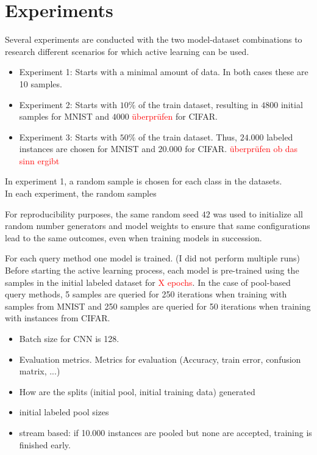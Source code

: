 \documentclass{article}
\theoremstyle{plain}
\theoremstyle{definition}
\theoremstyle{remark}
\begin{document}
\section{Experiments}\label{sec:experiments}
Several experiments are conducted with the two model-dataset combinations to research different scenarios for which active learning can be used.
\begin{itemize}
	\item Experiment 1: Starts with a minimal amount of data. In both cases these are 10 samples.
	\item Experiment 2: Starts with $10\%$ of the train dataset, resulting in $4800$ initial samples for MNIST and $4000$ \textcolor{red}{überprüfen} for CIFAR.
	\item Experiment 3: Starts with $50\%$ of the train dataset. Thus, $24.000$ labeled instances are chosen for MNIST and $20.000$ for CIFAR. \textcolor{red}{überprüfen ob das sinn ergibt}
\end{itemize}
In experiment 1, a random sample is chosen for each class in the datasets. \\
In each experiment, the random samples 

For reproducibility purposes, the same random seed $42$ was used to initialize all random number generators and model weights to ensure that same configurations lead to the same outcomes, even when training models in succession. 

For each query method one model is trained. (I did not perform multiple runs)
Before starting the active learning process, each model is pre-trained using the samples in the initial labeled dataset for \textcolor{red}{X epochs}. In the case of pool-based query methods, 5 samples are queried for 250 iterations when training with samples from MNIST and 250 samples are queried for 50 iterations when training with instances from CIFAR. 
\\
\begin{itemize}
	\item Batch size for CNN is 128.
	\item Evaluation metrics. Metrics for evaluation (Accuracy, train error, confusion matrix, ...)
	\item How are the splits (initial pool, initial training data) generated
	\item initial labeled pool sizes
	\item stream based: if 10.000 instances are pooled but none are accepted, training is finished early.
\end{itemize}
	
\end{document}
